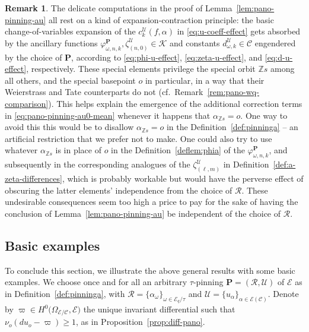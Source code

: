 \documentclass[preprint,12pt]{elsarticle}
\numberwithin{equation}{section} %
\theoremstyle{theorem}
\theoremstyle{definition}
\newtheorem{remark}[theorem]{Remark}
\newcommand{\Ca}{\mathcal{C}} %
\newcommand{\bk}{\mathcal{K}} %
\newcommand{\ec}{\mathcal{E}} %
\newcommand{\idec}{{o}} %
\newcommand{\ecq}{\ec_{q}}
\newcommand{\orbitq}{{\ecq/\tau}} %
\newcommand{\Z}{\mathbb{Z}} %
\newcommand{\za}[2]{\zeta^{\mathcal{U}}_{( {#1} , {#2} )}}
\begin{document}
\begin{remark}\label{rem:pano-pinning-a}
    The delicate computations in the proof of Lemma~\ref{lem:pano-pinning-au} all rest on a kind of expansion-contraction principle: the basic change-of-variables expansion of the $c^\mathcal{U}_k(f,\alpha)$ in \eqref{eq:u-coeff-effect} gets absorbed by the ancillary functions $\varphi^\mathbf{P}_{\omega,n,k},\za{n}{0}\in\bk$ and constants $d^\mathcal{U}_{\omega,k}\in\Ca$ engendered by the choice of $\mathbf{P}$, according to \eqref{eq:phi-u-effect}, \eqref{eq:zeta-u-effect}, and \eqref{eq:d-u-effect}, respectively. These special elements privilege the special orbit $\Z s$ among all others, and the special basepoint $\idec$ in particular, in a way that their Weierstrass and Tate counterparts do not (cf.~Remark~\ref{rem:pano-wq-comparison}). This helps explain the emergence of the additional correction terms in \eqref{eq:pano-pinning-au0-mean} whenever it happens that $\alpha_{\Z s}=\idec$. One way to avoid this this would be to disallow $\alpha_{\Z s}=\idec$ in the Definition~\ref{def:pinninga} -- an artificial restriction that we prefer not to make. One could also try to use whatever $\alpha_{\Z s}$ is in place of $\idec$ in the Definition~\ref{deflem:phia} of the $\varphi^\mathbf{P}_{\omega,n,k}$, and subsequently in the corresponding analogues of the $\za{\ell}{m}$ in Definition~\ref{def:a-zeta-differences}, which is probably workable but would have the perverse effect of obscuring the latter elements' independence from the choice of $\mathcal{R}$. These undesirable consequences seem too high a price to pay for the sake of having the conclusion of Lemma~\ref{lem:pano-pinning-au} be independent of the choice of $\mathcal{R}$.
\end{remark}



\subsection{Basic examples} \label{subsec:basic-examples-q}

To conclude this section, we illustrate the above general results with some basic examples. We choose once and for all an arbitrary $\tau$-pinning $\mathbf{P}=(\mathcal{R},\mathcal{U})$ of $\ec$ as in Definition~\ref{def:pinninga}, with $\mathcal{R}=\{\alpha_\omega\}_{\omega\in\orbitq}$ and $\mathcal{U}=\{u_\alpha\}_{\alpha\in\ec(\Ca)}$. Denote by $\varpi\in H^0\bigl(\Omega_{\ec/\Ca},\ec\bigr)$ the unique invariant differential such that $\nu_\idec(du_\idec -\varpi)\geq 1$, as in Proposition~\ref{prop:diff-pano}.
\end{document}
